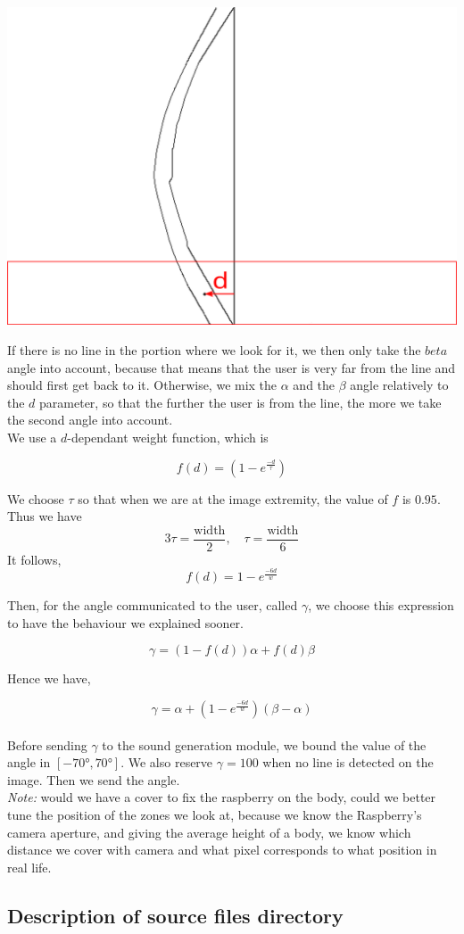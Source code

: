 \documentclass{rapport}
\begin{document}
\begin{center}
    \includegraphics[width=0.3\linewidth]{distance_bas_barycentre.png}
\end{center}
If there is no line in the portion where we look for it, we then only take the \(beta\) angle into account, because that means that the user is very far from the line and should first get back to it. Otherwise, we mix the \(\alpha\) and the \(\beta\) angle relatively to the \(d\) parameter, so that the further the user is from the line, the more we take the second angle into account.\\

We use a \(d\)-dependant weight function, which is

\[ f(d) = (1 - e^{\frac{-d}{\tau}}) \]

We choose \(\tau\) so that when we are at the image extremity, the value of \(f\) is \(0.95\). Thus we have
\[ 3\tau = \frac{\text{width}}{2}, \quad \tau = \frac{\text{width}}{6} \]
It follows,
\[f(d) = 1 - e^{\frac{-6d}{w}}\]

Then, for the angle communicated to the user, called \(\gamma\), we choose this expression to have the behaviour we explained sooner.

\[ \gamma = (1 - f(d))\alpha + f(d)\beta \]

Hence we have,

\[ \gamma = \alpha + (1 - e^{\frac{-6d}{w}})(\beta - \alpha) \]\\
Before sending \(\gamma\) to the sound generation module, we bound the value of the angle in \([-70°, 70°]\). We also reserve \(\gamma = 100\) when no line is detected on the image. Then we send the angle.\\
\textit{Note:} would we have a cover to fix the raspberry on the body, could we better tune the position of the zones we look at, because we know the Raspberry's camera aperture, and giving the average height of a body, we know which distance we cover with camera and what pixel corresponds to what position in real life.

\subsection{Description of source files directory}
\end{document}

